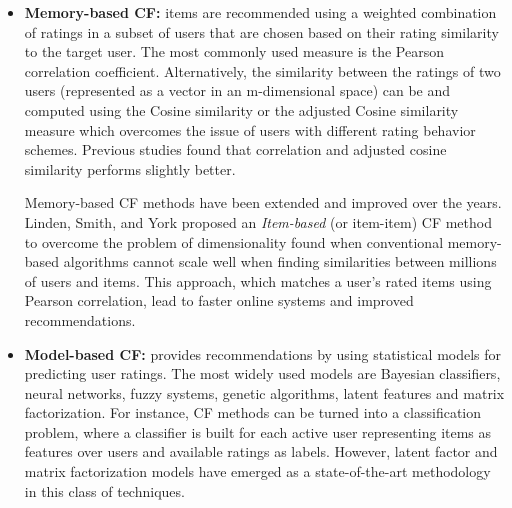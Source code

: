 \begin{itemize}
\item \textbf{Memory-based CF:} items are recommended using a weighted combination of ratings in a subset of users that are chosen based on their rating similarity to the target user. The most commonly used measure is the Pearson correlation coefficient\cite{resnick1994grouplens}.
Alternatively, the similarity between the ratings of two users (represented as a vector in an m-dimensional space) can be and computed using the Cosine similarity or the adjusted Cosine similarity measure which overcomes the issue of users with different rating behavior schemes\cite{yildirim2008random}. Previous studies found that correlation\cite{breese1998empirical} and adjusted cosine similarity\cite{yildirim2008random} performs slightly better.

Memory-based CF methods have been extended and improved over the years. Linden, Smith, and York\cite{linden2003amazon} proposed an \textit{Item-based} (or item-item) CF method to overcome the problem of dimensionality found when conventional memory-based algorithms cannot scale well when finding similarities between millions of users and items. This approach, which matches a user's rated items using Pearson correlation, lead to faster online systems and improved recommendations.

\item \textbf{Model-based CF:} provides recommendations by using statistical models for predicting user ratings. The most widely used models are Bayesian classifiers, neural networks, fuzzy systems, genetic algorithms, latent features and matrix factorization\cite{bobadilla2013recommender}. For instance, CF methods can be turned into a classification problem, where a classifier is built for each active user representing items as features over users and available ratings as labels. However, latent factor and matrix factorization models have emerged as a state-of-the-art methodology in this class of techniques\cite{koren2009matrix}.

\end{itemize}

